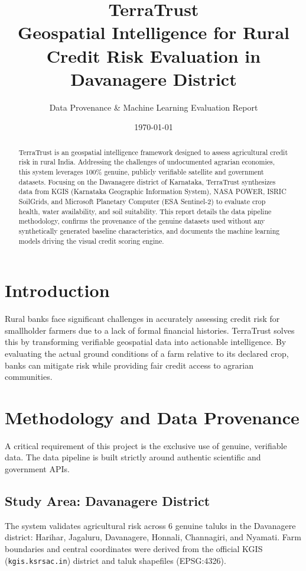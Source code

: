 \documentclass[12pt,a4paper]{article}
\title{\textbf{TerraTrust}\\ \Large Geospatial Intelligence for Rural Credit Risk Evaluation in Davanagere District}
\author{Data Provenance \& Machine Learning Evaluation Report}
\date{\today}
\begin{document}
\maketitle
\begin{abstract}
TerraTrust is an geospatial intelligence framework designed to assess agricultural credit risk in rural India. Addressing the challenges of undocumented agrarian economies, this system leverages 100\% genuine, publicly verifiable satellite and government datasets. Focusing on the Davanagere district of Karnataka, TerraTrust synthesizes data from KGIS (Karnataka Geographic Information System), NASA POWER, ISRIC SoilGrids, and Microsoft Planetary Computer (ESA Sentinel-2) to evaluate crop health, water availability, and soil suitability. This report details the data pipeline methodology, confirms the provenance of the genuine datasets used without any synthetically generated baseline characteristics, and documents the machine learning models driving the visual credit scoring engine.
\end{abstract}

\section{Introduction}
Rural banks face significant challenges in accurately assessing credit risk for smallholder farmers due to a lack of formal financial histories. TerraTrust solves this by transforming verifiable geospatial data into actionable intelligence. By evaluating the actual ground conditions of a farm relative to its declared crop, banks can mitigate risk while providing fair credit access to agrarian communities.

\section{Methodology and Data Provenance}
A critical requirement of this project is the exclusive use of genuine, verifiable data. The data pipeline is built strictly around authentic scientific and government APIs.

\subsection{Study Area: Davanagere District}
The system validates agricultural risk across 6 genuine taluks in the Davanagere district: Harihar, Jagaluru, Davanagere, Honnali, Channagiri, and Nyamati. Farm boundaries and central coordinates were derived from the official KGIS (\texttt{kgis.ksrsac.in}) district and taluk shapefiles (EPSG:4326).
\end{document}
